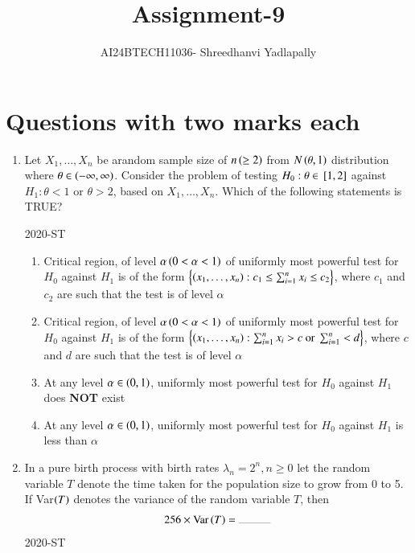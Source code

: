 \documentclass[journal,12pt,onecolumn]{IEEEtran}
\theoremstyle{remark}
\begin{document}

\vspace{3cm}

\title{Assignment-9}
\author{AI24BTECH11036- Shreedhanvi Yadlapally}
\maketitle

\bigskip
\renewcommand{\thefigure}{\theenumi}
\renewcommand{\thetable}{\theenumi}
\section{Questions with two marks each}

\begin{enumerate}

\item Let $X_{1}, \ldots, X_{n}$ be arandom sample size of $n\left(\geq 2\right)$ from $N\left(\theta, 1\right)$ distribution where $\theta \in \left(-\infty, \infty\right)$. Consider the problem of testing $H_{0}: \theta \in {}\left[1,2\right]$ against $H_{1}: \theta < 1$ or $\theta > 2$, based on $X_{1}, \ldots, X_{n}$. Which of the following statements is TRUE?

	\hfill{2020-ST}
	\begin{enumerate}
	\item Critical region, of level $\alpha \left(0<\alpha<1\right)$ of uniformly most powerful test for $H_{0}$ against $H_{1}$ is of the form $\left\{\left(x_{1}, \ldots, x_{n}\right): c_{1} \leq \sum_{i=1}^{n}x_{i} \leq c_{2}\right\}$, where $c_{1}$ and $c_{2}$ are such that the test is of level $\alpha$
	\item Critical region, of level $\alpha \left(0<\alpha<1\right)$ of uniformly most powerful test for $H_{0}$ against $H_{1}$ is of the form $\left\{\left(x_{1}, \ldots, x_{n}\right): \sum_{i=1}^{n}x_{i}>c \text{ or } \sum_{i=1}^{n}<d\right\}$, where $c$ and $d$ are such that the test is of level $\alpha$
	\item At any level $\alpha \in \left(0,1\right)$, uniformly most powerful test for $H_{0}$ against $H_{1}$ does \textbf{NOT} exist
	\item At any level $\alpha \in \left(0,1\right)$, uniformly most powerful test for $H_{0}$ against $H_{1}$ is less than $\alpha$	
	\end{enumerate}

\item In a pure birth process with birth rates $\lambda_{n}=2^{n}, n \geq 0$ let the random variable $T$ denote the time taken for the population size to grow from 0 to 5. If Var$\left(T\right)$ denotes the variance of the random variable $T$, then
	\begin{align*}
	 	256 \times \text{Var}\brak{T}= \rule{1cm}{0.2pt}
	\end{align*}
\hfill{2020-ST}



\end{enumerate}
\end{document}
